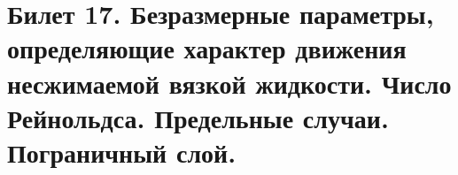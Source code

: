 \newpage
\section{Билет 17. Безразмерные параметры, определяющие характер движения несжимаемой вязкой жидкости. Число Рейнольдса. Предельные случаи. Пограничный слой.}